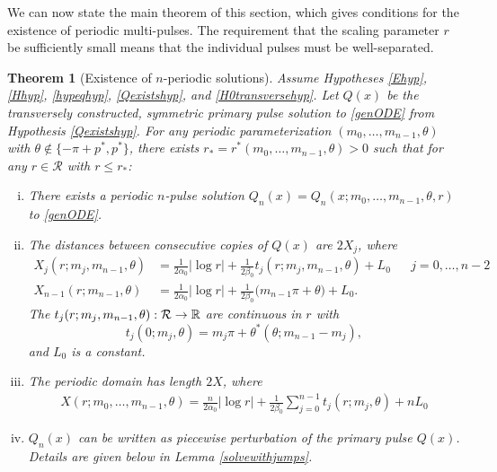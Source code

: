 \documentclass[11pt,reqno]{amsart}
\theoremstyle{plain}
\newtheorem{theorem}{Theorem}
\theoremstyle{definition}
\theoremstyle{remark}
\begin{document}
We can now state the main theorem of this section, which gives conditions for the existence of periodic multi-pulses. The requirement that the scaling parameter $r$ be sufficiently small means that the individual pulses must be well-separated.

\begin{theorem}[Existence of $n$-periodic solutions]\label{perexist}
Assume Hypotheses \ref{Ehyp}, \ref{Hhyp}, \ref{hypeqhyp}, \ref{Qexistshyp}, and \ref{H0transversehyp}. Let $Q(x)$ be the transversely constructed, symmetric primary pulse solution to \eqref{genODE} from Hypothesis \ref{Qexistshyp}. For any periodic parameterization $(m_0, \dots, m_{n-1}, \theta)$ with $\theta \notin \{-\pi + p^*, p^* \}$, there exists $r_* = r^*(m_0, \dots, m_{n-1}, \theta) > 0$ such that for any $r \in \mathcal{R}$ with $r \leq r_*$:
\begin{enumerate}[(i)]
	\item There exists a periodic $n$-pulse solution $Q_n(x) = Q_n(x; m_0, \dots, m_{n-1}, \theta, r)$ to \eqref{genODE}.

	\item The distances between consecutive copies of $Q(x)$ are $2X_j$, where
	\begin{align}\label{Xj}
		X_j(r; m_j, m_{n-1},\theta) &= \frac{1}{2 \alpha_0} |\log r| + \frac{1}{2\beta_0} t_j(r; m_j,m_{n-1}, \theta) + L_0 && j = 0, \dots, n-2 \\
		X_{n-1}(r; m_{n-1}, \theta) &= \frac{1}{2 \alpha_0} |\log r| + \frac{1}{2 \beta_0}\big( m_{n-1}\pi + \theta \big) + L_0.
	\end{align}
	The $t_j(r; m_j, m_{n-1}, \theta): \mathcal{R} \rightarrow \mathbb{R}$ are continuous in $r$ with 
	\[
	t_j(0; m_j, \theta) = m_j \pi + \theta^*(\theta; m_{n-1} - m_j),
	\]
	and $L_0$ is a constant.

	\item The periodic domain has length $2X$, where
	\begin{align}\label{Xdomain}
	X(r; m_0, \dots, m_{n-1}, \theta) = \frac{n}{2\alpha_0} |\log r| + \frac{1}{2\beta_0} \sum_{j=0}^{n-1} t_j(r; m_j, \theta) + n L_0
	\end{align}

	\item $Q_n(x)$ can be written as piecewise perturbation of the primary pulse $Q(x)$. 
	Details are given below in Lemma \ref{solvewithjumps}.
\end{enumerate}
\end{theorem}
\end{document}
